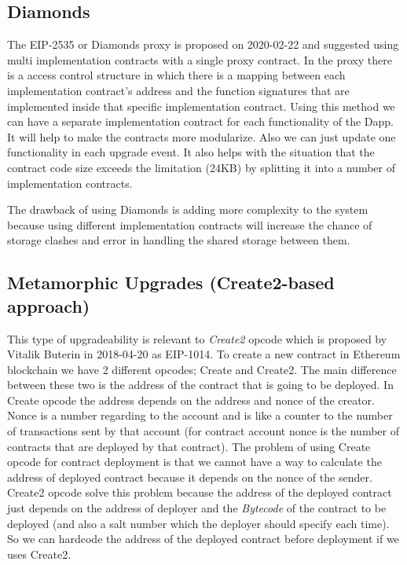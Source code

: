 \subsection{Diamonds}
The EIP-2535 or Diamonds proxy is proposed on 2020-02-22 and suggested using multi implementation contracts with a single proxy contract. In the proxy there is a access control structure in which there is a mapping between each implementation contract's address and the function signatures that are implemented inside that specific implementation contract. Using this method we can have a separate implementation contract for each functionality of the Dapp. It will help to make the contracts more modularize. Also we can just update one functionality in each upgrade event. It also helps with the situation that the contract code size exceeds the limitation (24KB) by splitting it into a number of implementation contracts.

The drawback of using Diamonds is adding more complexity to the system because using different implementation contracts will increase the chance of storage clashes and error in handling the shared storage between them.


\subsection{Metamorphic Upgrades (Create2-based approach)}
This type of upgradeability is relevant to \textit{Create2} opcode which is proposed by Vitalik Buterin in 2018-04-20 as EIP-1014. To create a new contract in Ethereum blockchain we have 2 different opcodes; Create and Create2. The main difference between these two is the address of the contract that is going to be deployed. In Create opcode the address depends on the address and nonce of the creator. Nonce is a number regarding to the account and is like a counter to the number of transactions sent by that account (for contract account nonce is the number of contracts that are deployed by that contract). The problem of using Create opcode for contract deployment is that we cannot have a way to calculate the address of deployed contract because it depends on the nonce of the sender. Create2 opcode solve this problem because the address of the deployed contract just depends on the address of deployer and the \textit{Bytecode} of the contract to be deployed (and also a salt number which the deployer should specify each time). So we can hardcode the address of the deployed contract before deployment if we uses Create2.

